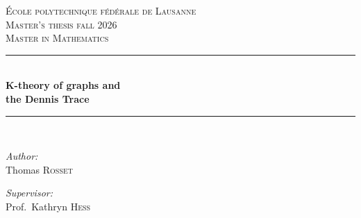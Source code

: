 \begin{titlepage}
\newcommand{\HRule}{\rule{\linewidth}{0.5mm}} %

\center{} %
 

\vspace{3cm}
\textsc{\LARGE École polytechnique fédérale de Lausanne}\\[1.5cm] %
\textsc{\Large Master's thesis fall 2026}\\[0.5cm] %
\textsc{\large Master in Mathematics}\\[0.5cm] %


\HRule{} \\[0.4cm] %
{ \huge \bfseries K-theory of graphs and \\ the Dennis Trace}\\[0.4cm] %
\HRule{} \\[1.5cm]
 

\begin{minipage}[t]{0.4\textwidth}
\begin{flushleft} \large
\emph{Author:}\\
Thomas \textsc{Rosset} \\%
\vfill
\end{flushleft}
\end{minipage}
\begin{minipage}[t]{0.4\textwidth}
\begin{flushright} \large
\emph{Supervisor:} \\
Prof.\ Kathryn \textsc{Hess} \\ %
\end{flushright}
\end{minipage}\\[10cm]


\end{titlepage}
